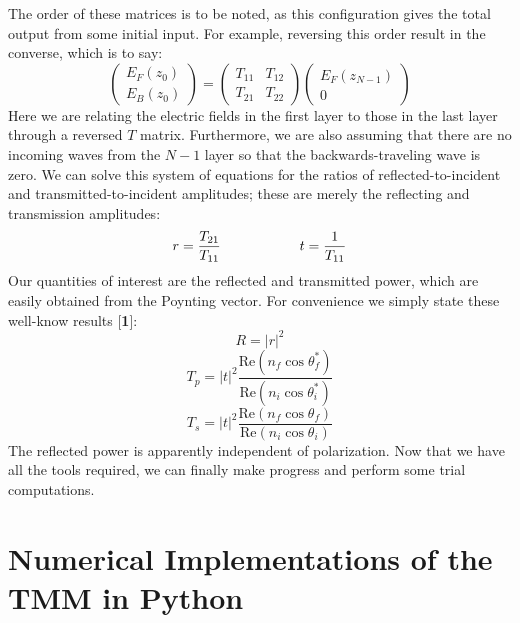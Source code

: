 \documentclass[preprint, onecolumn, amsmath, amssymb, aps]{revtex4-1}
\numberwithin{equation}{section}
\begin{document}
\noindent
The order of these matrices is to be noted, as this configuration gives the total output from some initial input. For example, reversing this order result in the converse, which is to say:
\begin{equation}
\begin{pmatrix}
	E_{F}(z_{0})  \\
	E_{B}(z_{0})
\end{pmatrix} =
\begin{pmatrix}
	T_{11} & T_{12} \\
	T_{21} & T_{22}
\end{pmatrix}  
\begin{pmatrix}
	E_{F}(z_{N - 1})  \\
	0
\end{pmatrix} \nonumber
\end{equation}
\noindent
Here we are relating the electric fields in the first layer to those in the last layer through a reversed $T$ matrix. Furthermore, we are also assuming that there are no incoming waves from the $N - 1$ layer so that the backwards-traveling wave is zero. We can solve this system of equations for the ratios of reflected-to-incident and transmitted-to-incident amplitudes; these are merely the reflecting and transmission amplitudes:
\begin{equation}
r = \frac{T_{21}}{T_{11}}  \hspace{20mm}   t = \frac{1}{T_{11}}
\end{equation}
\noindent
Our quantities of interest are the reflected and transmitted power, which are easily obtained from the Poynting vector. For convenience we simply state these well-know results [\textbf{1}]:
\begin{equation}\label{R}
R = |r|^{2}
\end{equation}
\begin{equation}
T_{p} = |t|^{2} \frac{  \mathrm{Re} ( n_{f} \cos \theta_{f}^{*} )  }{ \mathrm{Re} ( n_{i} \cos \theta_{i}^{*}  ) }
\end{equation}
\begin{equation}\label{T}
T_{s} = |t|^{2} \frac{  \mathrm{Re} ( n_{f} \cos \theta_{f} )  }{ \mathrm{Re} ( n_{i} \cos \theta_{i} ) }
\end{equation}
\noindent
The reflected power is apparently independent of polarization. Now that we have all the tools required, we can finally make progress and perform some trial computations.

\section{Numerical Implementations of the TMM in Python} 
\end{document}
